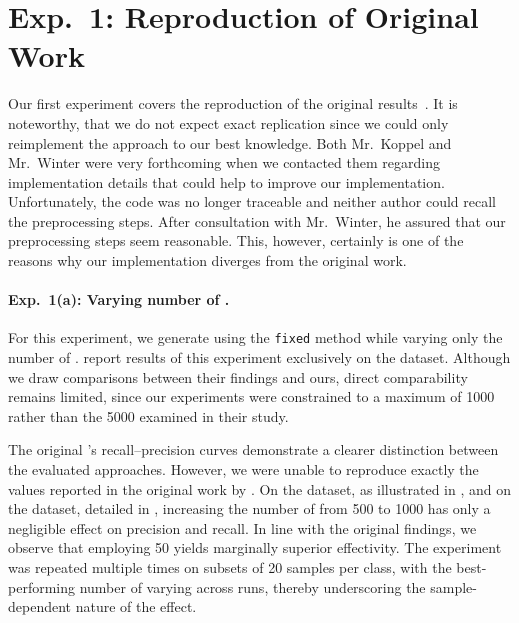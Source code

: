 
\section{Exp.\ 1: Reproduction of Original Work}

Our first experiment covers the reproduction of the original results~\citep{koppel_determining_2014}.
It is noteworthy, that we do not expect exact replication since we could only reimplement the approach to our best knowledge.
Both Mr.\ Koppel and Mr.\ Winter were very forthcoming when we contacted them regarding implementation details that could help to improve our implementation.
Unfortunately, the code was no longer traceable and neither author could recall the preprocessing steps.
After consultation with Mr.\ Winter, he assured that our preprocessing steps seem reasonable.
This, however, certainly is one of the reasons why our implementation diverges from the original work.

\paragraph{Exp.\ 1(a): Varying number of \imps{}.}

For this experiment, we generate \imps{} using the \texttt{fixed} method while varying only the number of \imps{}.
\citet{koppel_determining_2014} report results of this experiment exclusively on the \dataBlog{} dataset.
Although we draw comparisons between their findings and ours, direct comparability remains limited, since our experiments were constrained to a maximum of \num{1000} \imps{} rather than the \num{5000} examined in their study.

The original \impAppr{}'s recall–precision curves demonstrate a clearer distinction between the evaluated approaches.
However, we were unable to reproduce exactly the values reported in the original work by \citet{koppel_determining_2014}.
On the \dataBlog{} dataset, as illustrated in , and on the \dataStudent{} dataset, detailed in , increasing the number of \imps{} from 500 to \num{1000} has only a negligible effect on precision and recall.
In line with the original findings, we observe that employing 50 \imps{} yields marginally superior effectivity.
The experiment was repeated multiple times on subsets of 20 samples per class, with the best-performing number of \imps{} varying across runs, thereby underscoring the sample-dependent nature of the effect.




